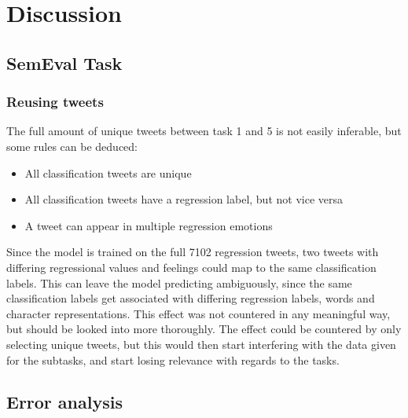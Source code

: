 
\section{Discussion}

\subsection{SemEval Task}
\subsubsection{Reusing tweets} \label{sec:tweetreuse}
The full amount of unique tweets between task 1 and 5 is not easily inferable, but some rules can be deduced:\\
\begin{itemize}
\item All classification tweets are unique
\item All classification tweets have a regression label, but not vice versa
\item A tweet can appear in multiple regression emotions
\end{itemize}
Since the model is trained on the full 7102 regression tweets, two tweets with differing regressional values and feelings could map to the same classification labels. This can leave the model predicting ambiguously, since the same classification labels get associated with differing regression labels, words and character representations. This effect was not countered in any meaningful way, but should be looked into more thoroughly. The effect could be countered by only selecting unique tweets, but this would then start interfering with the data given for the subtasks, and start losing relevance with regards to the tasks. 

\subsection{Error analysis}

